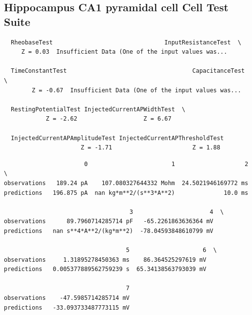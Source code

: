     
\subsection{Hippocampus CA1 pyramidal cell Cell Test
Suite}\label{hippocampus-ca1-pyramidal-cell-cell-test-suite}

    
    
    \begin{verbatim}
  RheobaseTest                                InputResistanceTest  \
     Z = 0.03  Insufficient Data (One of the input values was...   

  TimeConstantTest                                    CapacitanceTest  \
        Z = -0.67  Insufficient Data (One of the input values was...   

  RestingPotentialTest InjectedCurrentAPWidthTest  \
            Z = -2.62                   Z = 6.67   

  InjectedCurrentAPAmplitudeTest InjectedCurrentAPThresholdTest  
                      Z = -1.71                       Z = 1.88  
    \end{verbatim}
    
    \begin{verbatim}
                       0                        1                    2  \
observations   189.24 pA    107.080327644332 Mohm  24.5021946169772 ms   
predictions   196.875 pA  nan kg*m**2/(s**3*A**2)              10.0 ms   

                                    3                      4  \
observations      89.7960714285714 pF   -65.2261863636364 mV   
predictions   nan s**4*A**2/(kg*m**2)  -78.04593848610799 mV   

                                   5                     6  \
observations     1.31895278450363 ms    86.364525297619 mV   
predictions   0.005377889562759239 s  65.34138563793039 mV   

                                   7  
observations    -47.5985714285714 mV  
predictions   -33.093733487773115 mV  
    \end{verbatim}


